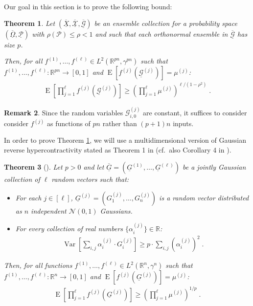 \documentclass{daj}
\newcommand{\1}{\mathbbm{1}}
\theoremstyle{plain}
\newtheorem{theorem}{Theorem}[section]
\theoremstyle{definition}
\newtheorem{remark}[theorem]{Remark}
\DeclareMathOperator*{\EE}{E}
\DeclareMathOperator*{\Var}{Var}
\begin{document}
Our goal in this section is to prove the following bound:
\begin{theorem}
\label{thm:gaussian-hypercontractivity-main}
Let $(\overline{\underline{X}}, \underline{\overline{\mathcal{X}}},
\underline{\overline{\mathcal{G}}})$ 
be an ensemble collection
for a probability space 
$(\underline{\overline{\Omega}}, \underline{\mathcal{P}})$
with $\rho(\mathcal{P}) \le \rho < 1$
and such that each orthonormal ensemble in $\overline{\underline{\mathcal{G}}}$
has size $p$.

Then, for all $f^{(1)}, \ldots, f^{(\ell)} \in L^2(\mathbb{R}^{pn}, \gamma^{pn})$
such that $f^{(1)}, \ldots, f^{(\ell)}: \mathbb{R}^{pn} \to [0, 1]$ and
$\EE\left[ f^{(j)}(\underline{\mathcal{G}}^{(j)}) \right] = \mu^{(j)}$:
\begin{align*}
  \EE \left[ \prod_{j=1}^\ell f^{(j)}(\underline{\mathcal{G}}^{(j)}) \right]
  \ge \left( \prod_{j=1}^\ell \mu^{(j)}  \right)^{\ell/(1-\rho^2)} \; .
\end{align*}
\end{theorem}

\begin{remark}
Since the random variables $\mathcal{G}^{(j)}_{i,0}$ are constant,
it suffices to consider consider $f^{(j)}$ as functions of $pn$ rather 
than $(p+1)n$ inputs. 
\end{remark}

In order to prove Theorem \ref{thm:gaussian-hypercontractivity-main},
we will use a multidimensional version of Gaussian reverse hypercontractivity
stated as Theorem 1 in \cite{CDP13} (cf.~also Corollary 4 in \cite{Led14}).

\begin{theorem}[\cite{CDP13}]\label{thm:gaussian-cdp} Let $p > 0$ and let
$\overline{\underline{G}} = (\underline{G}^{(1)}, \ldots, \underline{G}^{(\ell)})$
be a jointly Gaussian collection of $\ell$ random vectors such that:
\begin{itemize}
  \item
    For each $j \in [\ell]$, 
    $\underline{G}^{(j)} = (G_1^{(j)}, \ldots, G_n^{(j)})$
    is a random vector distributed as $n$ independent $\mathcal{N}(0, 1)$
    Gaussians.
  \item
    For every collection of real numbers $\{\alpha_{i}^{(j)}\} \in \mathbb{R}$:
    \begin{align}
     \label{eq:46a}
     \Var\left[ \sum_{i,j} \alpha_i^{(j)} \cdot G_i^{(j)} \right]
      \ge p \cdot \sum_{i,j} \left( \alpha_i^{(j)} \right)^2 \; .
    \end{align}
\end{itemize}
Then, for all functions $f^{(1)}, \ldots, f^{(\ell)} \in L^2(\mathbb{R}^n, \gamma^n)$
such that $f^{(1)}, \ldots, f^{(\ell)}: \mathbb{R}^n \to [0, 1]$
and $\EE\left[f^{(j)}(\underline{G}^{(j)})\right] = \mu^{(j)}$:
\begin{align*}
  \EE \left[ \prod_{j=1}^\ell f^{(j)}(\underline{G}^{(j)}) \right]
  \ge \left( \prod_{j=1}^\ell \mu^{(j)} \right)^{1/p} \; .
\end{align*}
\end{theorem}
\end{document}
